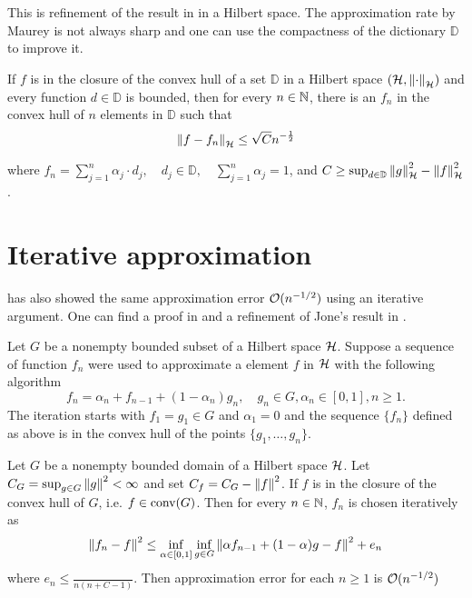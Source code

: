 \begin{remark}
    This is refinement of the result in \cite{pisierRemarquesResultatNon1980} in
    a Hilbert space. The approximation rate by Maurey is not always sharp and
    one can use the compactness of the dictionary $\mathbb{D}$ to improve it.
\end{remark}

\begin{corollary}
    \label{cor:maurey}
    If $f$ is in the closure of the convex hull of a set $\mathbb{D}$ in a
    Hilbert space $(\mathcal{H}, \left\| \cdot \right\|_{\mathcal{H}})$ and every function $d
    \in \mathbb{D}$ is bounded, then for every $n \in \mathbb{N}$, there is an $f_n$
    in the convex hull of $n$ elements in $\mathbb{D}$ such that
    \begin{equation}
        \left\| f - f_n \right\|_{\mathcal{H}}\leq \sqrt{C} n^{-\frac{1}{2}}
    \end{equation}

    where $f_n = \sum_{j=1}^n \alpha_j \cdot d_j, \quad d_j \in \mathbb{D},
    \quad \sum_{j=1}^n \alpha_j = 1$, and $C \geq \sup_{d\in \mathbb{D}}
    \left\| g \right\|_{\mathcal{H}}^2 - \left\| f \right\|_{\mathcal{H}}^2$.

\end{corollary}

\section{Iterative approximation}

\cite{jonesSimpleLemmaGreedy1992} has also showed the same approximation error
$\mathcal{O}(n^{-1/2})$ using an iterative argument. One can find a proof in
\cite[p. 611]{jonesSimpleLemmaGreedy1992} and a refinement of Jone's result in
\cite[Theorem 5]{barronUniversalApproximationBounds1993}. 

Let $G$ be a nonempty bounded subset of a Hilbert space $\mathcal{H}$. Suppose a
sequence of function $f_n$ were used to approximate a element $f$ in $\mathcal{H}$
with the following algorithm
\begin{equation}
    \label{eq:seq_appro_jones}
    f_n = \alpha_n + f_{n-1} + (1-\alpha_n) g_n, \quad
    g_n \in G, \alpha_n \in [0,1], n \geq 1.
\end{equation}
The iteration starts with $f_1 = g_1 \in G$ and $\alpha_1 = 0$ and the sequence
$\{f_n\}$ defined as above is in the convex hull of the points $\{g_1,\dots,
g_n\}$.

\begin{theorem}
    Let $G$ be a nonempty bounded domain of a Hilbert space $\mathcal{H}$. Let $C_G
    = \sup_{g\in G} \left\| g \right\|^2 < \infty$ and set $C_f = C_G - \left\| f \right\|^2$. If
    $f$ is in the closure of the convex hull of $G$, i.e. $f \in \operatorname*{conv}(G)$. Then
    for every $n \in \mathbb{N}$, $f_n$ is chosen iteratively as
    \begin{equation}
        \left\| f_n - f \right\|^2 \leq \inf_{\alpha \in [0,1]} \inf_{g \in G}
        \left\| \alpha f_{n-1} + (1-\alpha)g - f \right\|^2 + e_n
    \end{equation}
    where $e_n \leq \frac{}{n(n+C -1 )}$.
    Then approximation error for each $n \geq 1$ is $\mathcal{O}(n^{-1/2})$
\end{theorem}

